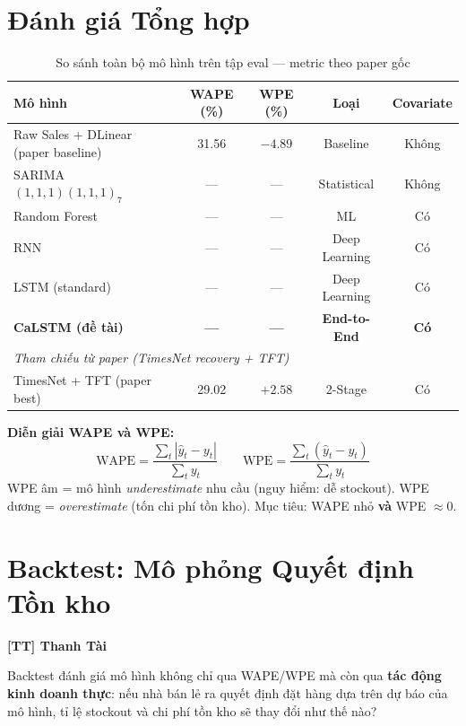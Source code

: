 \documentclass[12pt,a4paper]{report}
\newcommand{\ownerTT}{\colorbox{red!15}{\textbf{[TT] Thanh Tài}}}
\begin{document}
\section{Đánh giá Tổng hợp}

\begin{table}[H]
\centering
\caption{So sánh toàn bộ mô hình trên tập eval --- metric theo paper gốc}
\begin{tabular}{lcccc}
\toprule
\textbf{Mô hình} & \textbf{WAPE (\%)} & \textbf{WPE (\%)} & \textbf{Loại} & \textbf{Covariate} \\
\midrule
Raw Sales + DLinear (paper baseline) & 31.56 & $-4.89$ & Baseline     & Không \\
SARIMA$(1,1,1)(1,1,1)_7$            & ---   & ---     & Statistical  & Không \\
Random Forest                        & ---   & ---     & ML           & Có \\
RNN                                  & ---   & ---     & Deep Learning & Có \\
LSTM (standard)                      & ---   & ---     & Deep Learning & Có \\
\textbf{CaLSTM (đề tài)}            & \textbf{---} & \textbf{---} & \textbf{End-to-End} & \textbf{Có} \\
\midrule
\multicolumn{5}{l}{\textit{Tham chiếu từ paper (TimesNet recovery + TFT)}} \\
TimesNet + TFT (paper best)          & 29.02 & $+2.58$ & 2-Stage      & Có \\
\bottomrule
\end{tabular}
\end{table}

\textbf{Diễn giải WAPE và WPE:}
\[
\text{WAPE} = \frac{\sum_t |\hat{y}_t - y_t|}{\sum_t y_t} \qquad
\text{WPE} = \frac{\sum_t (\hat{y}_t - y_t)}{\sum_t y_t}
\]
WPE âm = mô hình \textit{underestimate} nhu cầu (nguy hiểm: dễ stockout). WPE dương = \textit{overestimate} (tốn chi phí tồn kho). Mục tiêu: WAPE nhỏ \textbf{và} WPE $\approx 0$.

\section{Backtest: Mô phỏng Quyết định Tồn kho}
\label{sec:backtest}
\ownerTT

Backtest đánh giá mô hình không chỉ qua WAPE/WPE mà còn qua \textbf{tác động kinh doanh thực}: nếu nhà bán lẻ ra quyết định đặt hàng dựa trên dự báo của mô hình, tỉ lệ stockout và chi phí tồn kho sẽ thay đổi như thế nào?
\end{document}
